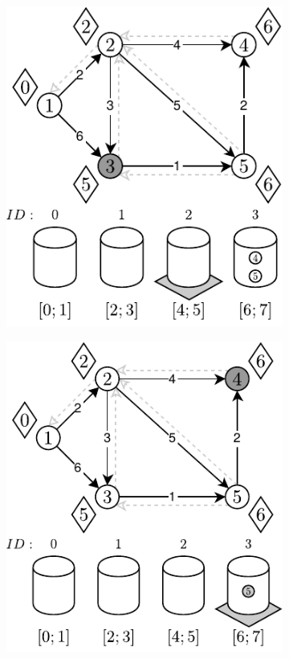 \begin{figure}[!htbp]
	\ContinuedFloat
	\centering
	\null\hfill
	\begin{subfigure}[b]{0.3\textwidth}
		\includegraphics[width=\textwidth]{Chapter_II/APROXIMATE-BUCKETS-Example/d.pdf}
		\caption{}
		\label{fig:exampleAproximateBuckets:d}
	\end{subfigure}
	\hfill
	\begin{subfigure}[b]{0.3\textwidth}
		\includegraphics[width=\textwidth]{Chapter_II/APROXIMATE-BUCKETS-Example/e.pdf}

\end{subfigure}
\end{figure}
